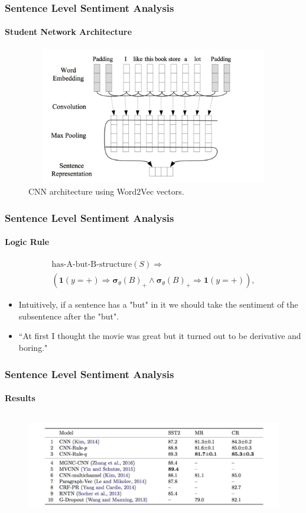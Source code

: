 \documentclass{beamer}
\begin{document}
\begin{frame}
\frametitle{Sentence Level Sentiment Analysis}
\framesubtitle{Student Network Architecture}
\begin{figure}
\begin{center}
\includegraphics[width=12cm, height=6cm]{cnn}
\caption{CNN architecture using Word2Vec vectors.}
\end{center}
\end{figure}
\end{frame}

\begin{frame}
\frametitle{Sentence Level Sentiment Analysis}
\framesubtitle{Logic Rule}
\begin{gather*}
\text{has-A-but-B-structure}(S) \Rightarrow \\
(\mathbf{1}(y = +) \Rightarrow \boldsymbol{\sigma}_\theta(B)_+ \land \boldsymbol{\sigma}_\theta(B)_+ \Rightarrow \mathbf{1}(y = +)),
\end{gather*}
\begin{itemize}
\item Intuitively, if a sentence has a "but" in it we should take the sentiment of the subsentence after the "but".
\item ``At first I thought the movie was great but it turned out to be derivative and boring."
\end{itemize}
\end{frame}

\begin{frame}
\frametitle{Sentence Level Sentiment Analysis}
\framesubtitle{Results}
\begin{figure}
\includegraphics[width=11.5cm, height=4.5cm]{cnn_results}
\end{figure}
\end{frame}
\end{document}
